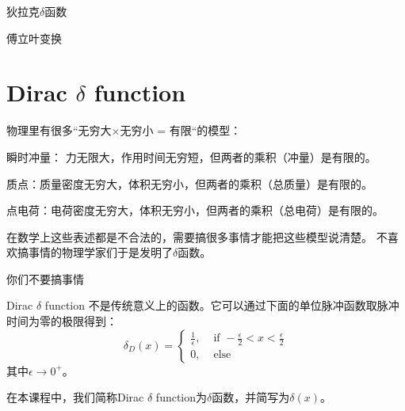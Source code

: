 \documentclass[CJK]{beamer}
\date{}
\begin{document}


\begin{frame}
\bch
\bitem
\item{狄拉克$\delta$函数}
\item{傅立叶变换}
\eitem
\ech
\end{frame}

\section{Dirac $\delta$ function}

\begin{frame}
  \bch
  物理里有很多“无穷大$\times$无穷小 = 有限“的模型：
  \bitem
\item{瞬时冲量： 力无限大，作用时间无穷短，但两者的乘积（冲量）是有限的。}
\item{质点：质量密度无穷大，体积无穷小，但两者的乘积（总质量）是有限的。}
\item{点电荷：电荷密度无穷大，体积无穷小，但两者的乘积（总电荷）是有限的。}
  \eitem

  \skiplines
  
  在数学上这些表述都是不合法的，需要搞很多事情才能把这些模型说清楚。 不喜欢搞事情的物理学家们于是发明了{\blue $\delta$函数}。
  \ech
\end{frame}

\begin{frame}
  \bch
  \bcenter

  你们不要搞事情
  \ecenter
  \ech
\end{frame}
  
\begin{frame}
  \bch
  \emini
  Dirac $\delta$ function 不是传统意义上的函数。它可以通过下面的{\blue 单位脉冲函数取脉冲时间为零的极限}得到：
  $$\delta_D(x) = \left\{\begin{array}{ll} \frac{1}{\epsilon}, & \text{ if } -\frac{\epsilon}{2}<x<\frac{\epsilon}{2} \\  0, & \text{ else}\end{array}\right. $$
  其中$\epsilon\rightarrow 0^+$。  
  \emini

  在本课程中，我们{\blue 简称Dirac $\delta$ function为$\delta$函数，并简写为$\delta(x)$}。
  \ech
\end{frame}
\end{document}
